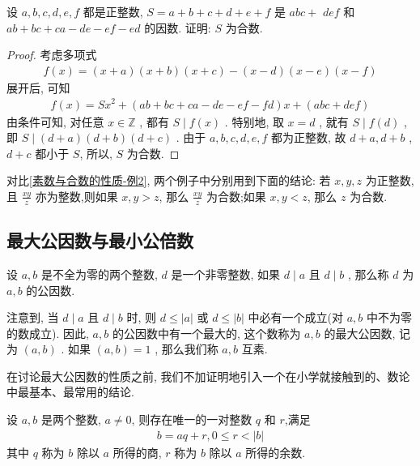 \begin{example}
	设 $a ,  b ,  c ,  d ,  e ,  f$ 都是正整数,  $S=a+b+c+d+e+f$ 是 $a b c+$ $d e f$ 和 $a b+b c+c a-d e-e f-e d$ 的因数. 证明: $S$ 为合数.
\end{example}
\begin{proof}
	考虑多项式
	\begin{align*}
		f(x)=(x+a)(x+b)(x+c)-(x-d)(x-e)(x-f)
	\end{align*}
	展开后, 可知
	\begin{align*}
		f(x)=S x^{2}+(a b+b c+c a-d e-e f-f d) x+(a b c+d e f)
	\end{align*}
	由条件可知, 对任意 $x \in \mathbb{Z}$ , 都有 $S \mid f(x)$ . 特别地, 取 $x=d$ , 就有 $S \mid f(d)$ , 即 $S \mid(d+a)(d+b)(d+c)$ . 由于 $a ,  b ,  c ,  d ,  e ,  f$ 都为正整数, 故 $d+a ,  d+b$ ,  $d+c$ 都小于 $S$, 所以, $S$ 为合数.
\end{proof}
\begin{note}
	对比\autoref{素数与合数的性质-例2}, 两个例子中分别用到下面的结论: 若 $x ,  y ,  z$ 为正整数, 且 $\frac{x y}{z}$ 亦为整数,则如果 $x ,  y>z$, 那么 $\frac{x y}{z}$ 为合数;如果 $x ,  y<z$, 那么 $z$ 为合数.
\end{note}

\subsection{最大公因数与最小公倍数}
设 $a ,  b$ 是不全为零的两个整数, $d$ 是一个非零整数, 如果 $d \mid a$ 且 $d \mid b$ , 那么称 $d$ 为 $a ,  b$ 的公因数.

注意到, 当 $d \mid a$ 且 $d \mid b$ 时, 则 $d \leqslant|a|$ 或 $d \leqslant|b|$ 中必有一个成立(对 $a ,  b$ 中不为零的数成立). 因此, $a ,  b$ 的公因数中有一个最大的, 这个数称为 $a ,  b$ 的最大公因数, 记为 $(a, b)$ . 如果 $(a, b)=1$ , 那么我们称 $a ,  b$ 互素.

在讨论最大公因数的性质之前, 我们不加证明地引入一个在小学就接触到的、数论中最基本、最常用的结论.
\begin{theorem}[带余数除法]
	设 $a ,  b$ 是两个整数, $a \neq 0$, 则存在唯一的一对整数 $q$ 和 $r$,满足
\begin{align*}
	b=a q+r, 0 \leqslant r<|b|
\end{align*}
其中 $q$ 称为 $b$ 除以 $a$ 所得的商, $r$ 称为 $b$ 除以 $a$ 所得的余数.\\
\end{theorem}

